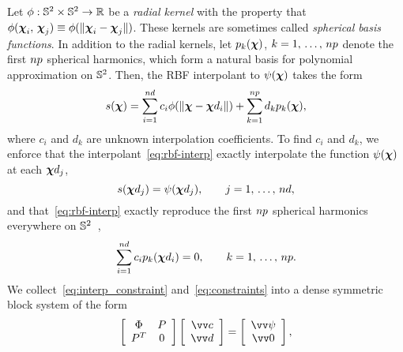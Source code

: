 Let $\phi:\mathbb{S}^2\times\mathbb{S}^2\to\mathbb{R}$ be a \emph{radial kernel} with the property that
$\phi(\boldsymbol{\chi}_i,\,\boldsymbol{\chi}_j)\equiv\phi(\|\boldsymbol{\chi}_i-\boldsymbol{\chi}_j\|)$. These kernels are
sometimes called \emph{spherical basis functions}. In addition to the radial kernels, let
$p_k(\boldsymbol{\chi})$, $k=1,\,\ldots,\,\poly\cardinality$ denote the first $\poly\cardinality$
spherical harmonics, which form a natural basis for polynomial approximation on
$\mathbb{S}^2$. Then, the RBF interpolant to $\psi(\boldsymbol{\chi})$ takes the form
\begin{equation}\label{eq:rbf-interp}
    s(\Xp)
    = \sum_{i=1}^{\data\cardinality} c_i \phi(\|\Xp-\data\Xp_i\|)
    + \sum_{k=1}^{\poly\cardinality} d_k p_k(\Xp),
\end{equation}
where $c_i$ and $d_k$ are unknown interpolation coefficients. To find $c_i$ and $d_k$, we
enforce that the interpolant~\eqref{eq:rbf-interp} exactly interpolate the function
$\psi(\boldsymbol{\chi})$ at each $\data\Xp_j$,
\begin{equation}
    s(\data\Xp_j) = \psi(\data\Xp_j), \qquad j=1,\,\ldots,\,\data\cardinality,\label{eq:interp_constraint}
\end{equation}
and that~\eqref{eq:rbf-interp} exactly reproduce the first $\poly\cardinality$ spherical
harmonics everywhere on $\mathbb{S}^2$~\cite{Fasshauer:2007ui},
\begin{equation}
    \sum_{i=1}^{\data\cardinality} c_i p_k(\data\Xp_i) = 0, \qquad k=1,\,\ldots,\,\poly\cardinality.\label{eq:constraints}
\end{equation}
We collect~\eqref{eq:interp_constraint} and~\eqref{eq:constraints} into a dense symmetric
block system of the form
\begin{equation}\label{eq:rbf-interp-matrix}
    \left[\begin{array}{cc}
            \Phi & P \\ P^T & 0
    \end{array}\right]\left[\begin{array}{c}
            \arr{c} \\ \arr{d}
    \end{array}\right] = \left[\begin{array}{c}
            \arr{\psi} \\ \arr{0}
    \end{array}\right],
\end{equation}
